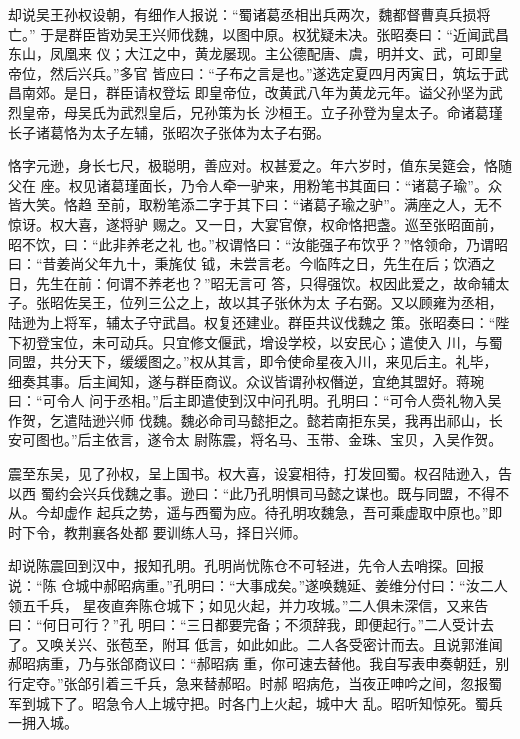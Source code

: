 却说吴王孙权设朝，有细作人报说：“蜀诸葛丞相出兵两次，魏都督曹真兵损将亡。”
于是群臣皆劝吴王兴师伐魏，以图中原。权犹疑未决。张昭奏曰：“近闻武昌东山，凤凰来
仪；大江之中，黄龙屡现。主公德配唐、虞，明并文、武，可即皇帝位，然后兴兵。”多官
皆应曰：“子布之言是也。”遂选定夏四月丙寅日，筑坛于武昌南郊。是日，群臣请权登坛
即皇帝位，改黄武八年为黄龙元年。谥父孙坚为武烈皇帝，母吴氏为武烈皇后，兄孙策为长
沙桓王。立子孙登为皇太子。命诸葛瑾长子诸葛恪为太子左辅，张昭次子张体为太子右弼。

恪字元逊，身长七尺，极聪明，善应对。权甚爱之。年六岁时，值东吴筵会，恪随父在
座。权见诸葛瑾面长，乃令人牵一驴来，用粉笔书其面曰：“诸葛子瑜”。众皆大笑。恪趋
至前，取粉笔添二字于其下曰：“诸葛子瑜之驴”。满座之人，无不惊讶。权大喜，遂将驴
赐之。又一日，大宴官僚，权命恪把盏。巡至张昭面前，昭不饮，曰：“此非养老之礼
也。”权谓恪曰：“汝能强子布饮乎？”恪领命，乃谓昭曰：“昔姜尚父年九十，秉旄仗
钺，未尝言老。今临阵之日，先生在后；饮酒之日，先生在前：何谓不养老也？”昭无言可
答，只得强饮。权因此爱之，故命辅太子。张昭佐吴王，位列三公之上，故以其子张休为太
子右弼。又以顾雍为丞相，陆逊为上将军，辅太子守武昌。权复还建业。群臣共议伐魏之
策。张昭奏曰：“陛下初登宝位，未可动兵。只宜修文偃武，增设学校，以安民心；遣使入
川，与蜀同盟，共分天下，缓缓图之。”权从其言，即令使命星夜入川，来见后主。礼毕，
细奏其事。后主闻知，遂与群臣商议。众议皆谓孙权僭逆，宜绝其盟好。蒋琬曰：“可令人
问于丞相。”后主即遣使到汉中问孔明。孔明曰：“可令人赍礼物入吴作贺，乞遣陆逊兴师
伐魏。魏必命司马懿拒之。懿若南拒东吴，我再出祁山，长安可图也。”后主依言，遂令太
尉陈震，将名马、玉带、金珠、宝贝，入吴作贺。

震至东吴，见了孙权，呈上国书。权大喜，设宴相待，打发回蜀。权召陆逊入，告以西
蜀约会兴兵伐魏之事。逊曰：“此乃孔明惧司马懿之谋也。既与同盟，不得不从。今却虚作
起兵之势，遥与西蜀为应。待孔明攻魏急，吾可乘虚取中原也。”即时下令，教荆襄各处都
要训练人马，择日兴师。

却说陈震回到汉中，报知孔明。孔明尚忧陈仓不可轻进，先令人去哨探。回报说：“陈
仓城中郝昭病重。”孔明曰：“大事成矣。”遂唤魏延、姜维分付曰：“汝二人领五千兵，
星夜直奔陈仓城下；如见火起，并力攻城。”二人俱未深信，又来告曰：“何日可行？”孔
明曰：“三日都要完备；不须辞我，即便起行。”二人受计去了。又唤关兴、张苞至，附耳
低言，如此如此。二人各受密计而去。且说郭淮闻郝昭病重，乃与张郃商议曰：“郝昭病
重，你可速去替他。我自写表申奏朝廷，别行定夺。”张郃引着三千兵，急来替郝昭。时郝
昭病危，当夜正呻吟之间，忽报蜀军到城下了。昭急令人上城守把。时各门上火起，城中大
乱。昭听知惊死。蜀兵一拥入城。


